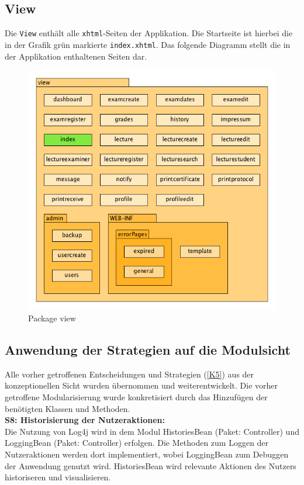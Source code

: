 
\newpage
\subsection{View}

Die \texttt{View} enthält alle \texttt{xhtml}-Seiten der Applikation. Die Startseite ist hierbei die in der Grafik grün markierte \texttt{index.xhtml}. Das folgende Diagramm stellt die in der Applikation enthaltenen Seiten dar.

\begin{figure}[H]
	\centering
  \includegraphics[width=\textwidth]{../UMLDiagramme/view/gfx/4_package_view.png}
	\caption{Package view}
	\label{fig 2}
\end{figure}


\subsection{Anwendung der Strategien auf die Modulsicht}
Alle vorher getroffenen Entscheidungen  und Strategien (\ref{K5}) aus der konzeptionellen Sicht wurden übernommen und weiterentwickelt. Die vorher getroffene Modularisierung wurde konkretisiert durch das Hinzufügen der benötigten Klassen und Methoden.\\

\textbf{S8: Historisierung der Nutzeraktionen:}\\
Die Nutzung von Log4j wird in dem Modul HistoriesBean (Paket: Controller) und LoggingBean (Paket: Controller) erfolgen. Die Methoden zum Loggen der Nutzeraktionen werden dort implementiert, wobei LoggingBean zum Debuggen der Anwendung genutzt wird. HistoriesBean wird relevante Aktionen des Nutzers historiseren und visualisieren.\\

